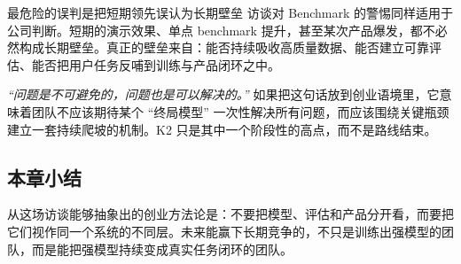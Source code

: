 \begin{warningbox}{最危险的误判是把短期领先误认为长期壁垒}
访谈对 Benchmark 的警惕同样适用于公司判断。短期的演示效果、单点 benchmark 提升，甚至某次产品爆发，都不必然构成长期壁垒。真正的壁垒来自：能否持续吸收高质量数据、能否建立可靠评估、能否把用户任务反哺到训练与产品闭环之中。
\end{warningbox}

\textit{``问题是不可避免的，问题也是可以解决的。''} 如果把这句话放到创业语境里，它意味着团队不应该期待某个 ``终局模型'' 一次性解决所有问题，而应该围绕关键瓶颈建立一套持续爬坡的机制。K2 只是其中一个阶段性的高点，而不是路线结束。

\subsection{本章小结}
从这场访谈能够抽象出的创业方法论是：不要把模型、评估和产品分开看，而要把它们视作同一个系统的不同层。未来能赢下长期竞争的，不只是训练出强模型的团队，而是能把强模型持续变成真实任务闭环的团队。


